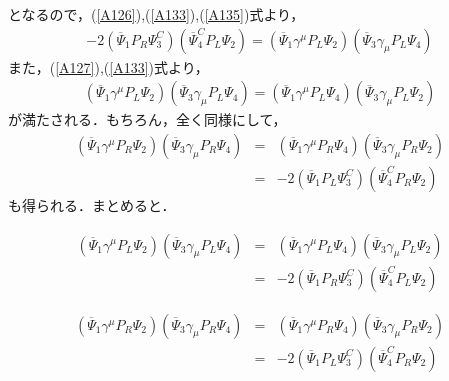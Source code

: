 となるので，(\ref{A126}),(\ref{A133}),(\ref{A135})式より，
\begin{eqnarray}
-2(\overline{\Psi}_{1}P_R\Psi_{3}^{C})(\overline{\Psi}_{4}^{C}P_L\Psi_{2})=(\overline{\Psi}_{1}\gamma^{\mu}P_L\Psi_{2})(\overline{\Psi}_{3}\gamma_{\mu}P_L\Psi_{4})
\end{eqnarray}
また，(\ref{A127}),(\ref{A133})式より，
\begin{eqnarray}
(\overline{\Psi}_{1}\gamma^{\mu}P_L\Psi_{2})(\overline{\Psi}_{3}\gamma_{\mu}P_L\Psi_{4})=(\overline{\Psi}_{1}\gamma^{\mu}P_L\Psi_{4})(\overline{\Psi}_{3}\gamma_{\mu}P_L\Psi_{2})
\end{eqnarray}
が満たされる．もちろん，全く同様にして，
\begin{eqnarray}
(\overline{\Psi}_{1}\gamma^{\mu}P_R\Psi_{2})(\overline{\Psi}_{3}\gamma_{\mu}P_R\Psi_{4})&=&(\overline{\Psi}_{1}\gamma^{\mu}P_R\Psi_{4})(\overline{\Psi}_{3}\gamma_{\mu}P_R\Psi_{2}) \\
&=&-2(\overline{\Psi}_{1}P_L\Psi_{3}^{C})(\overline{\Psi}_{4}^{C}P_R\Psi_{2})
\end{eqnarray}
も得られる．まとめると．
\begin{empheqboxed}
\begin{eqnarray}
(\overline{\Psi}_{1}\gamma^{\mu}P_L\Psi_{2})(\overline{\Psi}_{3}\gamma_{\mu}P_L\Psi_{4})&=&(\overline{\Psi}_{1}\gamma^{\mu}P_L\Psi_{4})(\overline{\Psi}_{3}\gamma_{\mu}P_L\Psi_{2}) \\
&=&-2(\overline{\Psi}_{1}P_R\Psi_{3}^{C})(\overline{\Psi}_{4}^{C}P_L\Psi_{2})
\end{eqnarray}

\begin{eqnarray}
(\overline{\Psi}_{1}\gamma^{\mu}P_R\Psi_{2})(\overline{\Psi}_{3}\gamma_{\mu}P_R\Psi_{4})&=&(\overline{\Psi}_{1}\gamma^{\mu}P_R\Psi_{4})(\overline{\Psi}_{3}\gamma_{\mu}P_R\Psi_{2}) \\
&=&-2(\overline{\Psi}_{1}P_L\Psi_{3}^{C})(\overline{\Psi}_{4}^{C}P_R\Psi_{2})
\end{eqnarray}


\end{empheqboxed}

